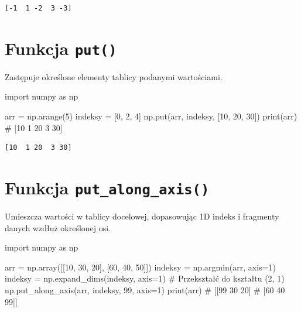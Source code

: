 \documentclass[
  polish,
  letterpaper,
  DIV=11,
  numbers=noendperiod]{scrreprt}
\newenvironment{Shaded}{\begin{snugshade}}{\end{snugshade}}
\newcommand{\BuiltInTok}[1]{\textcolor[rgb]{0.00,0.23,0.31}{#1}}
\newcommand{\CommentTok}[1]{\textcolor[rgb]{0.37,0.37,0.37}{#1}}
\newcommand{\DecValTok}[1]{\textcolor[rgb]{0.68,0.00,0.00}{#1}}
\newcommand{\ImportTok}[1]{\textcolor[rgb]{0.00,0.46,0.62}{#1}}
\newcommand{\NormalTok}[1]{\textcolor[rgb]{0.00,0.23,0.31}{#1}}
\newcommand{\OperatorTok}[1]{\textcolor[rgb]{0.37,0.37,0.37}{#1}}
\begin{document}
\begin{verbatim}
[-1  1 -2  3 -3]
\end{verbatim}

\section{\texorpdfstring{Funkcja
\texttt{put()}}{Funkcja put()}}\label{funkcja-put}

Zastępuje określone elementy tablicy podanymi wartościami.

\begin{Shaded}
\begin{Highlighting}[]
\ImportTok{import}\NormalTok{ numpy }\ImportTok{as}\NormalTok{ np}

\NormalTok{arr }\OperatorTok{=}\NormalTok{ np.arange(}\DecValTok{5}\NormalTok{)}
\NormalTok{indeksy }\OperatorTok{=}\NormalTok{ [}\DecValTok{0}\NormalTok{, }\DecValTok{2}\NormalTok{, }\DecValTok{4}\NormalTok{]}
\NormalTok{np.put(arr, indeksy, [}\DecValTok{10}\NormalTok{, }\DecValTok{20}\NormalTok{, }\DecValTok{30}\NormalTok{])}
\BuiltInTok{print}\NormalTok{(arr)  }\CommentTok{\# [10  1 20  3 30]}
\end{Highlighting}
\end{Shaded}

\begin{verbatim}
[10  1 20  3 30]
\end{verbatim}

\section{\texorpdfstring{Funkcja
\texttt{put\_along\_axis()}}{Funkcja put\_along\_axis()}}\label{funkcja-put_along_axis}

Umieszcza wartości w tablicy docelowej, dopasowując 1D indeks i
fragmenty danych wzdłuż określonej osi.

\begin{Shaded}
\begin{Highlighting}[]
\ImportTok{import}\NormalTok{ numpy }\ImportTok{as}\NormalTok{ np}

\NormalTok{arr }\OperatorTok{=}\NormalTok{ np.array([[}\DecValTok{10}\NormalTok{, }\DecValTok{30}\NormalTok{, }\DecValTok{20}\NormalTok{], [}\DecValTok{60}\NormalTok{, }\DecValTok{40}\NormalTok{, }\DecValTok{50}\NormalTok{]])}
\NormalTok{indeksy }\OperatorTok{=}\NormalTok{ np.argmin(arr, axis}\OperatorTok{=}\DecValTok{1}\NormalTok{)}
\NormalTok{indeksy }\OperatorTok{=}\NormalTok{ np.expand\_dims(indeksy, axis}\OperatorTok{=}\DecValTok{1}\NormalTok{)  }\CommentTok{\# Przekształć do kształtu (2, 1)}
\NormalTok{np.put\_along\_axis(arr, indeksy, }\DecValTok{99}\NormalTok{, axis}\OperatorTok{=}\DecValTok{1}\NormalTok{)}
\BuiltInTok{print}\NormalTok{(arr)}
\CommentTok{\# [[99 30 20]}
\CommentTok{\#  [60 40 99]]}
\end{Highlighting}
\end{Shaded}
\end{document}
